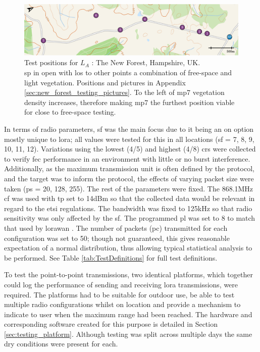   \begin{figure}[H]
    \centering
    \includegraphics[width=\textwidth]{Figures/new_forest_light.pdf}
    \caption[Test Location: The New Forest, Hampshire, UK]{
    Test positions for \textbf{$L_A$} :  The New Forest, Hampshire, UK.\\
    \ac{sp} in open with \ac{los} to other points a combination of free-space and light vegetation. Positions and pictures in Appendix \ref{sec:new_forest_testing_pictures}. To the left of \ac{mp}7 vegetation density increases, therefore making \ac{mp}7 the furthest position viable for close to free-space testing.
    }
    \label{fig:new_forest_map}
\end{figure}


 In terms of radio parameters, \ac{sf} was the main focus due to it being an on option mostly unique to \ac{lora}; all values were tested for this in all locations (\ac{sf} = 7, 8, 9, 10, 11, 12). Variations using the lowest (4/5) and highest (4/8) \ac{cr}s were collected to verify \ac{fec} performance in an environment with little or no burst interference. Additionally, as the maximum transmission unit is often defined by the protocol, and the target was to inform the protocol, the effects of varying packet size were taken (\ac{ps} = 20, 128, 255). The rest of the parameters were fixed. The 868.1MHz \ac{cf} was used with \ac{tp} set to 14dBm so that the collected data would be relevant in regard to the \ac{etsi} regulations. The bandwidth was fixed to 125kHz so that radio sensitivity was only affected by the \ac{sf}. The programmed \ac{pl} was set to 8 to match that used by \ac{lorawan} \cite{3YP:LORAWAN_REGIONAL_PARAMS}. The number of packets (\ac{pc}) transmitted for each configuration was set to 50; though not guaranteed, this gives reasonable expectation of a normal distribution, thus allowing typical statistical analysis to be performed. See Table \ref{tab:TestDefinitions} for full test definitions.
 
 To test the point-to-point transmissions, two identical platforms, which together could log the performance of sending and receiving \ac{lora} transmissions, were required. The platforms had to be suitable for outdoor use, be able to test multiple radio configurations whilst on location and provide a mechanism to indicate to user when the maximum range had been reached. The hardware and corresponding software created for this purpose is detailed in Section \ref{sec:testing_platform}. Although testing was split across multiple days the same dry conditions were present for each.
 
